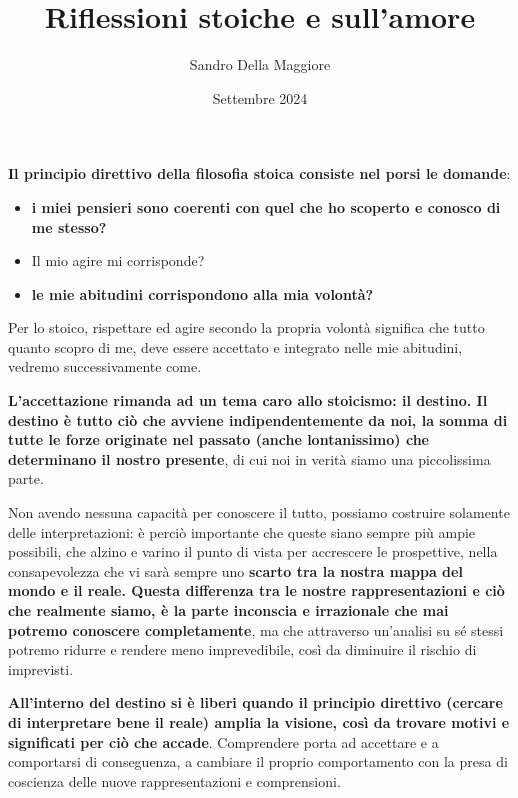 \documentclass[a4paper,12pt,oneside]{article}%
\begin{document}
	\author{Sandro Della Maggiore}
	\title{Riflessioni stoiche e sull'amore}
	\date{Settembre 2024}
	
	\maketitle


\textbf{Il principio direttivo della filosofia stoica consiste nel porsi le domande}:

\begin{itemize}
	\item \textbf{i miei pensieri sono coerenti con quel che ho scoperto e conosco di me stesso?}
	\item Il mio agire mi corrisponde?
	\item \textbf{le mie abitudini corrispondono alla mia volontà?}
\end{itemize}

Per lo stoico, rispettare ed agire secondo la propria volontà significa che tutto quanto scopro di me, deve essere accettato e integrato nelle mie abitudini, vedremo successivamente come.

\textbf{L'accettazione rimanda ad un tema caro allo stoicismo: il destino. Il destino è tutto ciò che avviene indipendentemente da noi, la somma di tutte le forze originate nel passato (anche lontanissimo) che determinano il nostro presente}, di cui noi in verità siamo una piccolissima parte.

Non avendo nessuna capacità per conoscere il tutto, possiamo costruire solamente delle interpretazioni: è perciò importante che queste siano sempre più ampie possibili, che alzino e varino il punto di vista per accrescere le prospettive, nella consapevolezza che vi sarà sempre uno \textbf{scarto tra la nostra mappa del mondo e il reale. Questa differenza tra le nostre rappresentazioni e ciò che realmente siamo, è la parte inconscia e irrazionale che mai potremo conoscere completamente}, ma che attraverso un'analisi su sé stessi potremo ridurre e rendere meno imprevedibile, così da diminuire il rischio di imprevisti.

\textbf{All'interno del destino si è liberi quando il principio direttivo (cercare di interpretare bene il reale) amplia la visione, così da trovare motivi e significati per ciò che accade}. Comprendere porta ad accettare e a comportarsi di conseguenza, a cambiare il proprio comportamento con la presa di coscienza delle nuove rappresentazioni e comprensioni.
\end{document}
